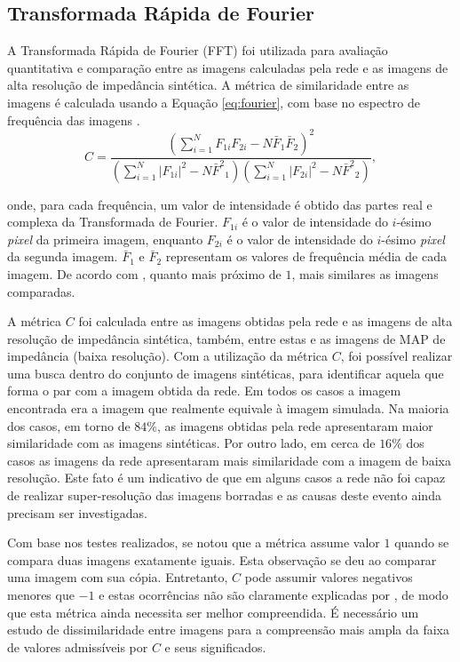 \subsection{Transformada Rápida de Fourier}

A Transformada Rápida de Fourier (FFT) foi utilizada para avaliação quantitativa e comparação entre as imagens calculadas pela rede
e as imagens de alta resolução de impedância sintética. A métrica de similaridade entre as imagens é calculada usando
a Equação \ref{eq:fourier}, com base no espectro de frequência das imagens \citep{Narayana15}.
\begin{equation}
 C = \frac{ (\sum_{i=1}^{N}{F_{1i}F_{2i}} - N \bar{F}_1\bar{F}_2 )^2 }{ (\sum_{i=1}^{N}{|F_{1i}|^2} - N{\bar{F}^2}_1)( \sum_{i=1}^{N}{|F_{2i}|^2} - N{\bar{F}^2}_2 )},
 \label{eq:fourier}
\end{equation}

onde, para cada frequência, um valor de intensidade é obtido das partes real e complexa da Transformada de Fourier.
$F_{1i}$ é o valor de intensidade do $i$-ésimo \textit{pixel} da primeira imagem, enquanto $F_{2i}$
é o valor de intensidade do $i$-ésimo \textit{pixel} da segunda imagem. $\bar{F}_1$ e $\bar{F}_2$ representam os valores
de frequência média de cada imagem. De acordo com \cite{Narayana15}, quanto mais próximo de $1$, mais similares as imagens
comparadas.

A métrica $C$ foi calculada entre as imagens obtidas pela rede e as imagens de alta resolução de impedância sintética, também, entre estas e
as imagens de MAP de impedância (baixa resolução). Com a utilização da métrica $C$, foi possível realizar uma busca dentro do conjunto de 
imagens sintéticas, para identificar aquela que forma o par com a imagem obtida da rede. Em todos os casos a imagem encontrada era a imagem
que realmente equivale à imagem simulada. Na maioria dos casos, em torno de $84\%$, as imagens obtidas pela rede
apresentaram maior similaridade com as imagens sintéticas. Por outro lado, em cerca de $16\%$ dos casos as imagens da rede apresentaram mais similaridade com
a imagem de baixa resolução. Este fato é um indicativo de que em alguns casos a rede não foi capaz de realizar super-resolução das imagens borradas e
as causas deste evento ainda precisam ser investigadas.

Com base nos testes realizados, se notou que a métrica assume valor $1$ quando se compara duas imagens exatamente iguais.
Esta observação se deu ao comparar uma imagem com sua cópia. Entretanto, $C$ pode assumir valores negativos menores que $-1$ e estas ocorrências
não são claramente explicadas por \cite{Narayana15}, de modo que esta métrica ainda necessita ser melhor compreendida. É necessário
um estudo de dissimilaridade entre imagens para a compreensão mais ampla da faixa de valores admissíveis por $C$ e seus significados.

